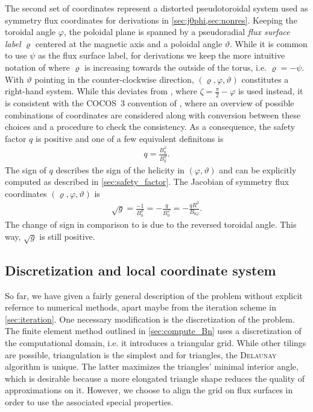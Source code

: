 \documentclass[a4paper, twoside, 10pt, english]{article}
\numberwithin{equation}{section}
\let\temp\varrho
\let\varrho\rho
\let\rho\temp
\let\temp\vartheta
\let\vartheta\theta
\let\theta\temp
\let\temp\varphi
\let\varphi\phi
\let\phi\temp
\begin{document}
The second set of coordinates represent a distorted pseudotoroidal system used as symmetry flux coordinates for derivations in \cref{sec:j0phi,sec:nonres}. Keeping the toroidal angle $\phi$, the poloidal plane is spanned by a pseudoradial \emph{flux surface label} $\rho$ centered at the magnetic axis and a poloidal angle $\theta$. While it is common to use $\psi$ as the flux surface label, for derivations we keep the more intuitive notation of \textcite{dHaeseleer91} where $\rho$ is increasing towards the outside of the torus, i.e. $\rho = -\psi$. With $\theta$ pointing in the counter-clockwise direction, $(\rho, \phi, \theta)$ constitutes a right-hand system. While this deviates from \textcite{dHaeseleer91}, where $\zeta = \frac{\pi}{2} - \phi$ is used instead, it is consistent with the COCOS~3 convention of \textcite{Sauter13}, where an overview of possible combinations of coordinates are considered along with conversion between these choices and a procedure to check the consistency. As a consequence, the safety factor $q$ is positive and one of a few equivalent definitons is
\begin{gather}
  q = \frac{B_{0}^{\phi}}{B_{0}^{\theta}}. \label{eq:q_field_line_pitch}
\end{gather}
The sign of $q$ describes the sign of the helicity in $(\phi, \theta)$ and can be explicitly computed as described in \cref{sec:safety_factor}. The Jacobian of symmetry flux coordinates $(\rho, \phi, \theta)$ is
\begin{gather}
  \sqrt{g} = \frac{-1}{B_{0}^{\theta}} = -\frac{q}{B_{0}^{\phi}} = -\frac{q R^{2}}{B_{0 \phi}}. \label{eq:flux_metric}
\end{gather}
The change of sign in comparison to \textcite{dHaeseleer91} is due to the reversed toroidal angle. This way, $\sqrt{g}$ is still positive.

\subsection{Discretization and local coordinate system}
\label{sec:grid}

So far, we have given a fairly general description of the problem without explicit refernce to numerical methods, apart maybe from the iteration scheme in \cref{sec:iteration}. One necessary modification is the discretization of the problem. The finite element method outlined in \cref{sec:compute_Bn} uses a discretization of the computational domain, i.e. it introduces a triangular grid. While other tilings are possible, triangulation is the simplest and for triangles, the \textsc{Delaunay} algorithm is unique. The latter maximizes the triangles' minimal interior angle, which is desirable because a more elongated triangle shape reduces the quality of approximations on it. However, we choose to align the grid on flux surfaces in order to use the associated special properties.
\end{document}
